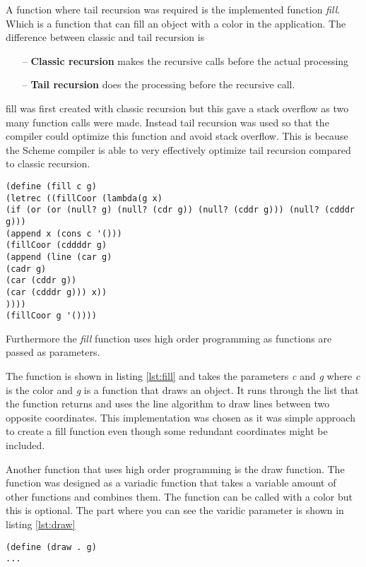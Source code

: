 A function where tail recursion was required is the implemented function \emph{fill}. Which is a function that can fill an object with a color in the application. The difference between classic and tail recursion is
\begin{itemize}
	\item[--] \textbf{Classic recursion} makes the recursive calls before the actual processing
	\item[--] \textbf{Tail recursion} does the processing before the recursive call.  
\end{itemize}

fill was first created with classic recursion but this gave a stack overflow as two many function calls were made. Instead tail recursion was used so that the compiler could optimize this function and avoid stack overflow.  This is because the Scheme compiler is able to very effectively optimize tail recursion compared to classic recursion.

\begin{lstlisting}[caption={Scheme function fill}, label=lst:fill]
(define (fill c g)
(letrec ((fillCoor (lambda(g x)
(if (or (or (null? g) (null? (cdr g)) (null? (cddr g))) (null? (cdddr g)))
(append x (cons c '()))
(fillCoor (cddddr g)
(append (line (car g)
(cadr g)
(car (cddr g))
(car (cdddr g))) x))
))))
(fillCoor g '())))
\end{lstlisting}

Furthermore the \emph{fill} function uses high order programming as functions are passed as parameters. 

The function is shown in listing \ref{lst:fill} and takes the parameters \emph{c} and \emph{g} where \emph{c} is the color and \emph{g} is a function that draws an object. It runs through the list that the function returns and uses the line algorithm to draw lines between two opposite coordinates. This implementation was chosen as it was simple approach to create a fill function even though some redundant coordinates might be included. 

Another function that uses high order programming is the draw function. The function was designed as a variadic function that takes a variable amount of other functions and combines them. The function can be called with a color but this is optional. The part where you can see the varidic parameter is shown 
in listing \ref{lst:draw}
 
\begin{lstlisting}[caption={Part of Scheme function draw }, label=lst:draw]
(define (draw . g)
...
\end{lstlisting}